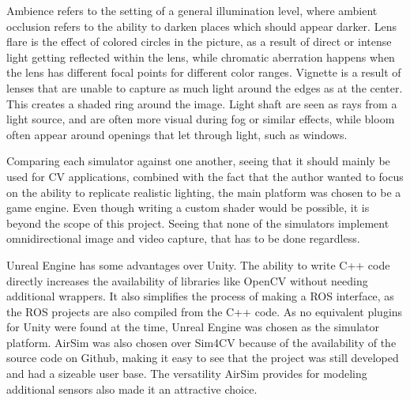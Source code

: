 Ambience refers to the setting of a general illumination level, where ambient occlusion refers to the ability to darken places which should appear darker. Lens flare is the effect of colored circles in the picture, as a result of direct or intense light getting reflected within the lens, while chromatic aberration happens when the lens has different focal points for different color ranges. Vignette is a result of lenses that are unable to capture as much light around the edges as at the center. This creates a shaded ring around the image. Light shaft are seen as rays from a light source, and are often more visual during fog or similar effects, while bloom often appear around openings that let through light, such as windows.

Comparing each simulator against one another, seeing that it should mainly be used for CV applications, combined with the fact that the author wanted to focus on the ability to replicate realistic lighting, the main platform was chosen to be a game engine. Even though writing a custom shader would be possible, it is beyond the scope of this project. Seeing that none of the simulators implement omnidirectional image and video capture, that has to be done regardless.

Unreal Engine has some advantages over Unity. The ability to write C++ code directly increases the availability of libraries like OpenCV without needing additional wrappers. It also simplifies the process of making a ROS interface, as the ROS projects are also compiled from the C++ code. As no equivalent plugins for Unity were found at the time, Unreal Engine was chosen as the simulator platform. AirSim was also chosen over Sim4CV because of the availability of the source code on Github, making it easy to see that the project was still developed and had a sizeable user base. The versatility AirSim provides for modeling additional sensors also made it an attractive choice.


